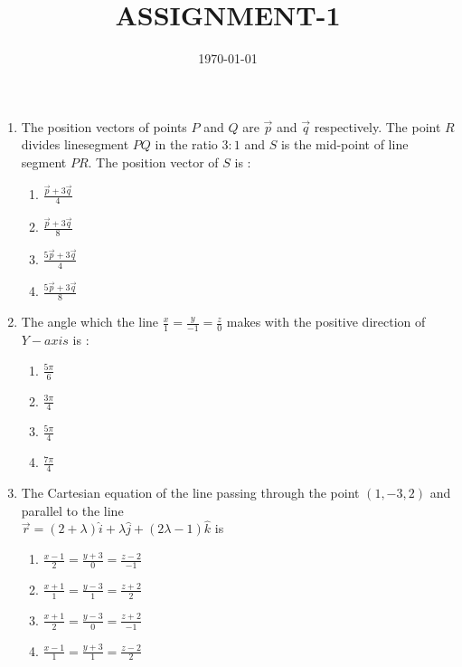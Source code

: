 \documentclass{article}
\title{ASSIGNMENT-1}
\date{\today}
\providecommand{\brak}[1]{\ensuremath{\left(#1\right)}}
\begin{document}
\begin{enumerate}
		\section{VECTOR GRAPHS}
\item The position vectors of points $P$ and $Q$ are $\vec{p}$ and $\vec{q}$ respectively. The point $R$ divides linesegment $PQ$ in the ratio $3 \colon 1$ and $S$ is the mid-point of line segment $PR$. The position vector of $S$ is :
        \begin{enumerate}
                \item $\frac{\vec{p} + 3\vec{q}}{4}$
                \item $\frac{\vec{p} + 3\vec{q}}{8}$
                \item $\frac{5\vec{p} + 3\vec{q}}{4}$
                \item $\frac{5\vec{p} + 3\vec{q}}{8}$
        \end{enumerate}

                                \item The angle which the line $\frac{x}{1} = \frac{y}{-1} = \frac{z}{0} $ makes with the positive direction of $Y-axis$ is :
                                        \begin{enumerate}
						\item $\frac{5\pi}{6}$
                                                \item $\frac{3\pi}{4}$
                                                \item $\frac{5\pi}{4}$
                                                \item $\frac{7\pi}{4}$
                                        \end{enumerate}

				\item The Cartesian equation of the line passing through the point $\brak{1,-3,2}$ and parallel to the line\\
					$\vec{r} = \brak{2+\lambda}\hat{i} + \lambda \hat{j} + \brak{2\lambda-1}\hat{k}$ is
\begin{enumerate}
        \item $\frac{x-1}{2} = \frac{y+3}{0} = \frac{z-2}{-1}$
        \item $\frac{x+1}{1} = \frac{y-3}{1} = \frac{z+2}{2}$
        \item $\frac{x+1}{2} = \frac{y-3}{0} = \frac{z+2}{-1}$
    \item $\frac{x-1}{1} = \frac{y+3}{1} = \frac{z-2}{2}$
\end{enumerate}
\end{enumerate}
\end{document}

